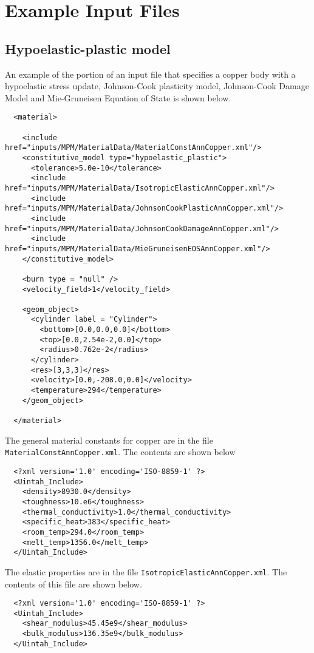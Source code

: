 \chapter{Example Input Files}
  \section{Hypoelastic-plastic model}
  An example of the portion of an input file that specifies a copper body
  with a hypoelastic stress update, Johnson-Cook plasticity model,
  Johnson-Cook Damage Model and Mie-Gruneisen Equation of State is shown 
  below.
  \lstset{language=XML}
  \begin{lstlisting}
  <material>

    <include href="inputs/MPM/MaterialData/MaterialConstAnnCopper.xml"/>
    <constitutive_model type="hypoelastic_plastic">
      <tolerance>5.0e-10</tolerance>
      <include href="inputs/MPM/MaterialData/IsotropicElasticAnnCopper.xml"/>
      <include href="inputs/MPM/MaterialData/JohnsonCookPlasticAnnCopper.xml"/>
      <include href="inputs/MPM/MaterialData/JohnsonCookDamageAnnCopper.xml"/>
      <include href="inputs/MPM/MaterialData/MieGruneisenEOSAnnCopper.xml"/>
    </constitutive_model>

    <burn type = "null" />
    <velocity_field>1</velocity_field>

    <geom_object>
      <cylinder label = "Cylinder">
        <bottom>[0.0,0.0,0.0]</bottom>
        <top>[0.0,2.54e-2,0.0]</top>
        <radius>0.762e-2</radius>
      </cylinder>
      <res>[3,3,3]</res>
      <velocity>[0.0,-208.0,0.0]</velocity>
      <temperature>294</temperature>
    </geom_object>

  </material>
  \end{lstlisting}

  The general material constants for copper are in the file 
  \verb+MaterialConstAnnCopper.xml+.  The contents are shown below
  \lstset{language=XML}
  \begin{lstlisting}
  <?xml version='1.0' encoding='ISO-8859-1' ?>
  <Uintah_Include>
    <density>8930.0</density>
    <toughness>10.e6</toughness>
    <thermal_conductivity>1.0</thermal_conductivity>
    <specific_heat>383</specific_heat>
    <room_temp>294.0</room_temp>
    <melt_temp>1356.0</melt_temp>
  </Uintah_Include>
  \end{lstlisting}

  The elastic properties are in the file \verb+IsotropicElasticAnnCopper.xml+.
  The contents of this file are shown below.
  \lstset{language=XML}
  \begin{lstlisting}
  <?xml version='1.0' encoding='ISO-8859-1' ?>
  <Uintah_Include>
    <shear_modulus>45.45e9</shear_modulus>
    <bulk_modulus>136.35e9</bulk_modulus>
  </Uintah_Include>
  \end{lstlisting}
  
